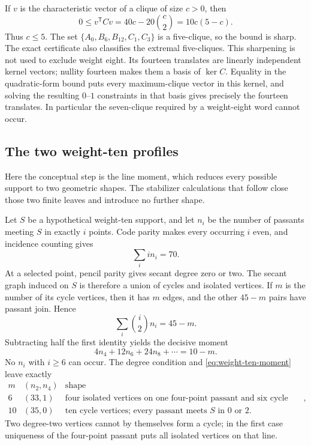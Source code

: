 \documentclass[11pt]{article}
\theoremstyle{definition}
\theoremstyle{remark}
\begin{document}
If \(v\) is the characteristic vector of a clique of size \(c>0\), then
\[
 0\le v^{\mathsf T}Cv
   =40c-20\binom c2=10c(5-c).
\]
Thus \(c\le5\).  The set
\(\{A_0,B_6,B_{12},C_1,C_3\}\) is a five-clique, so the bound is sharp.
The exact certificate also classifies the extremal five-cliques.  This
sharpening is not used to exclude weight eight.
Its fourteen translates are linearly independent kernel vectors;
nullity fourteen makes them a basis of \(\ker C\).  Equality in the
quadratic-form bound puts every maximum-clique vector in this kernel, and
solving the resulting \(0\)--\(1\) constraints in that basis gives precisely
the fourteen translates.  In particular the seven-clique required by a
weight-eight word cannot occur.

\subsection{The two weight-ten profiles}

Here the conceptual step is the line moment, which reduces every possible
support to two geometric shapes.  The stabilizer calculations that follow
close those two finite leaves and introduce no further shape.

Let \(S\) be a hypothetical weight-ten support, and let \(n_i\) be the
number of passants meeting \(S\) in exactly \(i\) points.  Code parity makes
every occurring \(i\) even, and incidence counting gives
\[
 \sum_i i n_i=70.
\]
At a selected point, pencil parity gives secant degree zero or two.  The
secant graph induced on \(S\) is therefore a union of cycles and isolated
vertices.  If \(m\) is the number of its cycle vertices, then it has \(m\)
edges, and the other \(45-m\) pairs have passant join.  Hence
\[
 \sum_i\binom{i}{2}n_i=45-m.
\]
Subtracting half the first identity yields the decisive moment
\begin{equation}
 4n_4+12n_6+24n_8+\cdots=10-m.       \label{eq:weight-ten-moment}
\end{equation}
No \(n_i\) with \(i\ge6\) can occur.  The degree condition and
\eqref{eq:weight-ten-moment} leave exactly
\[
\begin{array}{c|c|c}
m&(n_2,n_4)&\text{shape}\\ \hline
6&(33,1)&\text{four isolated vertices on one four-point passant and six cycle vertices},\\
10&(35,0)&\text{ten cycle vertices; every passant meets }S\text{ in }0\text{ or }2.
\end{array}
\]
Two degree-two vertices cannot by themselves form a cycle; in the
first case uniqueness of the four-point passant puts all isolated vertices
on that line.
\end{document}
